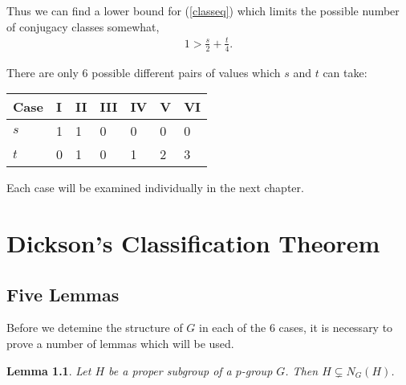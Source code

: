 \documentclass[a4paper , 11pt]{book}
\newtheorem{lemma}[theorem]{Lemma}
\theoremstyle{definition}
\theoremstyle{remark}
\begin{document}
Thus we can find a lower bound for (\ref{classeq}) which limits the possible number of conjugacy classes somewhat,
\begin{align*} 1 > \frac{s}{2} + \frac{t}{4}.
\end{align*}

There are only 6 possible different pairs of values which $s$ and $t$ can take: \vspace{3mm}

\begin{center}
\centering
  \begin{tabular}{||P{1.5cm}||P{1cm}|P{1cm}|P{1cm}|P{1cm}|P{1cm}|P{1cm}||}
\hline
Case & I & II & III & IV & V & VI \\ [1ex]
\hline\hline
 $s$ & 1 & 1 & 0 & 0 & 0 & 0 \\ [1ex]
\hline
$t$ & 0 & 1 & 0 & 1 & 2 & 3 \\ [1ex]
 \hline
\end{tabular}
\end{center}
\vspace{2mm}

Each case will be examined individually in the next chapter.

\chapter{Dickson's Classification Theorem}

\section{Five Lemmas}

Before we detemine the structure of $G$ in each of the 6 cases, it is necessary to prove a number of lemmas which will be used.

\begin{lemma}\label{case2q}  Let $H$ be a proper subgroup of a $p$-group $G$. Then $H \subsetneq N_G(H)$.
\end{lemma}
\end{document}
